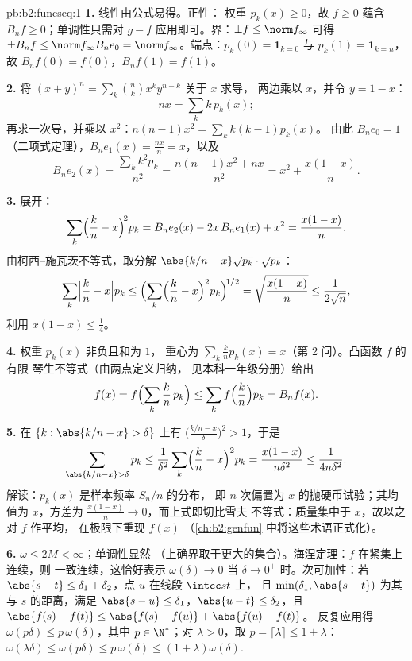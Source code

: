 \begin{solution}{pb:b2:funcseq:1}
\textbf{1.} 线性由公式易得。正性：
权重 $p_k(x) \geq 0$，故 $f \geq 0$ 蕴含 $B_nf \geq
0$；单调性只需对 $g - f$ 应用即可。界：$\pm f \leq
\norm f_\infty$ 可得 $\pm B_nf \leq \norm f_\infty B_ne_0 =
\norm f_\infty$。端点：$p_k(0) = \mathbf 1_{k=0}$ 与
$p_k(1) = \mathbf 1_{k=n}$，故 $B_nf(0) = f(0)$，$B_nf(1) =
f(1)$。

\textbf{2.} 将 $(x+y)^n = \sum_k\binom nk x^ky^{n-k}$ 关于 $x$ 求导，
两边乘以 $x$，并令 $y = 1 - x$：
\[
nx = \sum_k k\,p_k(x) ;
\]
再求一次导，并乘以 $x^2$：$n(n-1)x^2 = \sum_k k(k-1)p_k(x)$。
由此 $B_ne_0 = 1$（二项式定理），$B_ne_1(x) =
\frac{nx}{n} = x$，以及
\[
B_ne_2(x) = \frac{\sum_k k^2p_k}{n^2}
= \frac{n(n-1)x^2 + nx}{n^2}
= x^2 + \frac{x(1-x)}{n} .
\]

\textbf{3.} 展开：
\[
\sum_k\Bigl(\frac kn - x\Bigr)^{\!2} p_k
= B_ne_2(x) - 2x\,B_ne_1(x) + x^2
= \frac{x(1-x)}{n} .
\]
由柯西–施瓦茨不等式，取分解 $\abs{k/n - x}\sqrt{p_k}
\cdot \sqrt{p_k}$：
\[
\sum_k\Bigl|\frac kn - x\Bigr| p_k
\leq \Bigl(\sum_k\Bigl(\frac kn - x\Bigr)^2
p_k\Bigr)^{\!1/2}
= \sqrt{\frac{x(1-x)}{n}} \leq \frac{1}{2\sqrt n},
\]
利用 $x(1-x) \leq \frac14$。

\textbf{4.} 权重 $p_k(x)$ 非负且和为 $1$，
重心为 $\sum_k \frac kn p_k(x) = x$（第 2 问）。凸函数 $f$ 的有限
琴生不等式（由两点定义归纳，
见本科一年级分册）给出
\[
f(x) = f\Bigl(\sum_k \frac kn\,p_k\Bigr)
\leq \sum_k f\Bigl(\frac kn\Bigr)p_k = B_nf(x) .
\]

\textbf{5.} 在 $\{k : \abs{k/n - x} > \delta\}$ 上有
$\bigl(\frac{k/n - x}{\delta}\bigr)^2 > 1$，于是
\[
\sum_{\abs{k/n-x}>\delta} p_k
\leq \frac{1}{\delta^2}\sum_k\Bigl(\frac kn -
x\Bigr)^2p_k
= \frac{x(1-x)}{n\delta^2} \leq \frac{1}{4n\delta^2} .
\]
解读：$p_k(x)$ 是样本频率 $S_n/n$ 的分布，
即 $n$ 次偏置为 $x$ 的抛硬币试验；其均值为 $x$，方差为
$\frac{x(1-x)}n \to 0$，而上式即切比雪夫
不等式：质量集中于 $x$，故以之对 $f$ 作平均，
在极限下重现 $f(x)$
（\cref{ch:b2:genfun} 中将这些术语正式化）。

\textbf{6.} $\omega \leq 2M < \infty$；单调性显然
（上确界取于更大的集合）。海涅定理：$f$ 在紧集上连续，则
一致连续，这恰好表示 $\omega(\delta) \to 0$
当 $\delta \to 0^+$ 时。次可加性：若 $\abs{s - t} \leq
\delta_1 + \delta_2$，点 $u$ 在线段 $\intcc st$ 上，
且 $\min(\delta_1, \abs{s-t})$ 为其与 $s$ 的距离，满足
$\abs{s-u} \leq \delta_1$，$\abs{u-t} \leq \delta_2$，且
$\abs{f(s)-f(t)} \leq \abs{f(s)-f(u)} + \abs{f(u)-f(t)}$。
反复应用得 $\omega(p\delta) \leq p\,\omega(\delta)$，其中 $p \in
\N^*$；对 $\lambda > 0$，取 $p = \lceil\lambda\rceil \leq 1
+ \lambda$：$\omega(\lambda\delta) \leq \omega(p\delta) \leq
p\,\omega(\delta) \leq (1+\lambda)\omega(\delta)$.


\end{solution}

